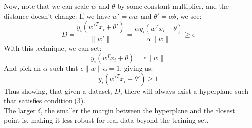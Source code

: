 \begin{enumerate}
\begin{enumerate}
                Now, note that we can scale $w$ and $\theta$ by some constant multiplier, and the distance doesn't change. If we have $w' = \alpha w$ and $\theta ' = \alpha \theta$, we see:
                $$D = \frac{y_i(w'^Tx_i+\theta ')}{\|w'\|} = \frac{\alpha y_i(w^Tx_i+\theta)}{\alpha \|w\|} \geq \epsilon$$
                With this technique, we can set:
                $$y_i(w^Tx_i+\theta) = \epsilon \|w\|$$
                And pick an $\alpha$ such that $\epsilon \|w\| \alpha = 1$, giving us:
                $$y_i(w'^Tx_i+\theta ') \geq 1$$
                Thus showing, that given a dataset, $D$, there will always exist a hyperplane such that satisfies condition (3).\\
                The larger $\delta$, the smaller the margin between the hyperplane and the closest point is, making it less robust for real data beyond the training set.
                

\end{enumerate}
\end{enumerate}
